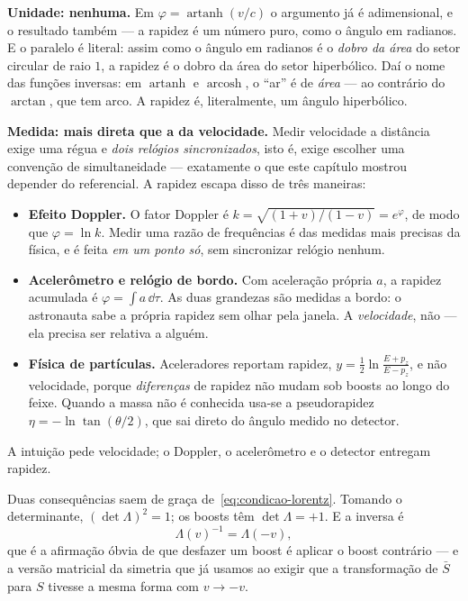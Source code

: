 \documentclass[12pt,a4paper,oneside]{book}
\theoremstyle{rgplain}
\theoremstyle{rgremark}
\begin{document}
\begin{roteiro}[title={\sffamily\bfseries\footnotesize\color{rgGrafite}A RAPIDEZ TEM UNIDADE? DÁ PARA MEDI-LA?}]
\textbf{Unidade: nenhuma.} Em $\varphi=\operatorname{artanh}(v/c)$ o argumento já
é adimensional, e o resultado também --- a rapidez é um número puro, como o
ângulo em radianos. E o paralelo é literal: assim como o ângulo em radianos é o
\emph{dobro da área} do setor circular de raio $1$, a rapidez é o dobro da área
do setor hiperbólico. Daí o nome das funções inversas: em $\operatorname{artanh}$
e $\operatorname{arcosh}$, o ``ar'' é de \emph{área} --- ao contrário do
$\arctan$, que tem arco. A rapidez é, literalmente, um ângulo hiperbólico.

\textbf{Medida: mais direta que a da velocidade.} Medir velocidade a distância
exige uma régua e \emph{dois relógios sincronizados}, isto é, exige escolher uma
convenção de simultaneidade --- exatamente o que este capítulo mostrou depender
do referencial. A rapidez escapa disso de três maneiras:

\begin{itemize}
  \item \textbf{Efeito Doppler.} O fator Doppler é $k=\sqrt{(1+v)/(1-v)}=e^{\varphi}$,
  de modo que $\varphi=\ln k$. Medir uma razão de frequências é das medidas mais
  precisas da física, e é feita \emph{em um ponto só}, sem sincronizar relógio
  nenhum.
  \item \textbf{Acelerômetro e relógio de bordo.} Com aceleração própria $a$, a
  rapidez acumulada é $\varphi=\int a\,\dd\tau$. As duas grandezas são medidas a
  bordo: o astronauta sabe a própria rapidez sem olhar pela janela. A
  \emph{velocidade}, não --- ela precisa ser relativa a alguém.
  \item \textbf{Física de partículas.} Aceleradores reportam rapidez,
  $y=\tfrac12\ln\frac{E+p_z}{E-p_z}$, e não velocidade, porque \emph{diferenças}
  de rapidez não mudam sob boosts ao longo do feixe. Quando a massa não é
  conhecida usa-se a pseudorapidez $\eta=-\ln\tan(\theta/2)$, que sai direto do
  ângulo medido no detector.
\end{itemize}

A intuição pede velocidade; o Doppler, o acelerômetro e o detector entregam
rapidez.
\end{roteiro}

Duas consequências saem de graça de~\eqref{eq:condicao-lorentz}. Tomando o
determinante, $(\det\Lambda)^2=1$; os boosts têm $\det\Lambda=+1$. E a inversa é
\begin{equation}
  \Lambda(v)^{-1}=\Lambda(-v),
  \label{eq:inversa-boost}
\end{equation}
que é a afirmação óbvia de que desfazer um boost é aplicar o boost contrário ---
e a versão matricial da simetria que já usamos ao exigir que a transformação de
$\bar S$ para $S$ tivesse a mesma forma com $v\to-v$.
\end{document}

